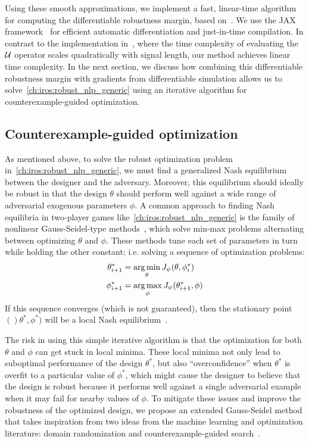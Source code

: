 Using these smooth approximations, we implement a fast, linear-time algorithm for computing the differentiable robustness margin, based on~\cite{donzeEfficientRobustMonitoring2013a}. We use the JAX framework~\cite{jax2018github} for efficient automatic differentiation and just-in-time compilation. In contrast to the implementation in~\cite{leungBackPropagationSignalTemporal2021}, where the time complexity of evaluating the $\mathcal{U}$ operator scales quadratically with signal length, our method achieves linear time complexity. In the next section, we discuss how combining this differentiable robustness margin with gradients from differentiable simulation allows us to solve~\eqref{ch:iros:robust_nlp_generic} using an iterative algorithm for counterexample-guided optimization.

\subsection{Counterexample-guided optimization}\label{ch:iros:cego}

As mentioned above, to solve the robust optimization problem in~\eqref{ch:iros:robust_nlp_generic}, we must find a generalized Nash equilibrium between the designer and the adversary. Moreover, this equilibrium should ideally be robust in that the design $\theta$ should perform well against a wide range of adversarial exogenous parameters $\phi$.
%
A common approach to finding Nash equilibria in two-player games like~\eqref{ch:iros:robust_nlp_generic} is the family of nonlinear Gauss-Seidel-type methods~\cite{facchineiGeneralizedNashEquilibrium2007}, which solve min-max problems alternating between optimizing $\theta$ and $\phi$. These methods tune each set of parameters in turn while holding the other constant; i.e. solving a sequence of optimization problems:
\begin{subequations}
	\begin{align}\label{ch:iros:eq:gauss_seidel}
		\theta^*_{i+1} & = \operatorname*{arg\,min}_\theta J_\psi(\theta, \phi^*_i)   \\
		\phi^*_{i+1}   & = \operatorname*{arg\,max}_\phi J_\psi(\theta^*_{i+1}, \phi)
	\end{align}
\end{subequations}
%
If this sequence converges (which is not guaranteed), then the stationary point $()\theta^*, \phi^*)$ will be a local Nash equilibrium~\cite{facchineiGeneralizedNashEquilibrium2007}.

The risk in using this simple iterative algorithm is that the optimization for both $\theta$ and $\phi$ can get stuck in local minima. These local minima not only lead to suboptimal performance of the design $\theta^*$, but also ``overconfidence'' when $\theta^*$ is overfit to a particular value of $\phi^*$, which might cause the designer to believe that the design is robust because it performs well against a single adversarial example when it may fail for nearby values of $\phi$.
%
To mitigate these issues and improve the robustness of the optimized design, we propose an extended Gauss-Seidel method that takes inspiration from two ideas from the machine learning and optimization literature: domain randomization and counterexample-guided search~\cite{tobinDomainRandomizationTransferring2017,changNeuralLyapunovControl2019}.

